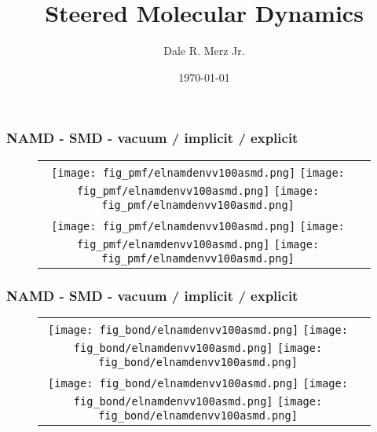 \documentclass[9pt]{beamer} %
\title[]{Steered Molecular Dynamics}
\author{Dale R. Merz Jr.}
\institute[Ga Tech]
{ Georgia Institute of Technology \\
  \medskip {\emph{dmerz3@gatech.edu}} }
\date{\today}
\begin{document}
\begin{frame}
\frametitle{NAMD - SMD - vacuum / implicit / explicit}
{}
\begin{figure}
\begin{tabular}{cc}
\hspace*{-1cm}
\texttt{[image: fig\_pmf/elnamdenvv100asmd.png]}
\texttt{[image: fig\_pmf/elnamdenvv100asmd.png]}
\texttt{[image: fig\_pmf/elnamdenvv100asmd.png]} \\
\hspace*{-1cm}
\texttt{[image: fig\_pmf/elnamdenvv100asmd.png]}
\texttt{[image: fig\_pmf/elnamdenvv100asmd.png]}
\texttt{[image: fig\_pmf/elnamdenvv100asmd.png]} \\
\end{tabular}
\end{figure}
\end{frame}
\begin{frame}
\frametitle{NAMD - SMD - vacuum / implicit / explicit}
{}
\begin{figure}
\begin{tabular}{cc}
\hspace*{-1cm}
\texttt{[image: fig\_bond/elnamdenvv100asmd.png]}
\texttt{[image: fig\_bond/elnamdenvv100asmd.png]}
\texttt{[image: fig\_bond/elnamdenvv100asmd.png]} \\
\hspace*{-1cm}
\texttt{[image: fig\_bond/elnamdenvv100asmd.png]}
\texttt{[image: fig\_bond/elnamdenvv100asmd.png]}
\texttt{[image: fig\_bond/elnamdenvv100asmd.png]} \\
\end{tabular}
\end{figure}
\end{frame}
%
% 
\end{document}
